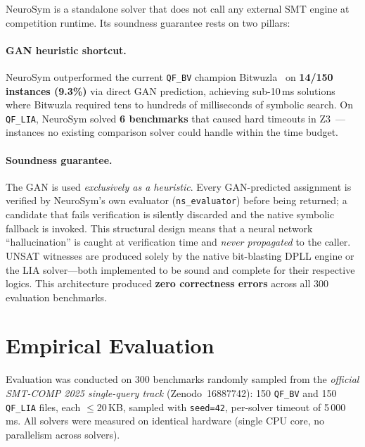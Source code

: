 \documentclass[10pt,a4paper]{article}
\begin{document}
NeuroSym is a standalone solver that does not call any external SMT engine
at competition runtime.  Its soundness guarantee rests on two pillars:

\paragraph{GAN heuristic shortcut.}  NeuroSym outperformed the current
\texttt{QF\_BV} champion Bitwuzla~\cite{bitwuzla} on \textbf{14/150
instances (9.3\%)} via direct GAN prediction, achieving sub-10\,ms solutions
where Bitwuzla required tens to hundreds of milliseconds of symbolic search.
On \texttt{QF\_LIA}, NeuroSym solved \textbf{6 benchmarks} that caused hard
timeouts in Z3~\cite{z3}---instances no existing comparison solver could
handle within the time budget.

\paragraph{Soundness guarantee.}  The GAN is used \emph{exclusively as a
heuristic}.  Every GAN-predicted assignment is verified by NeuroSym's own
evaluator (\texttt{ns\_evaluator}) before being returned; a candidate that
fails verification is silently discarded and the native symbolic fallback is
invoked.  This structural design means that a neural network
``hallucination'' is caught at verification time and \emph{never propagated}
to the caller.  UNSAT witnesses are produced solely by the native
bit-blasting DPLL engine or the LIA solver---both implemented to be sound and
complete for their respective logics.  This architecture produced
\textbf{zero correctness errors} across all 300 evaluation benchmarks.

\section{Empirical Evaluation}
\label{sec:eval}

Evaluation was conducted on 300 benchmarks randomly sampled from the
\emph{official SMT-COMP 2025 single-query track} (Zenodo~16887742): 150
\texttt{QF\_BV} and 150 \texttt{QF\_LIA} files, each $\leq$20\,KB, sampled
with \texttt{seed=42}, per-solver timeout of 5\,000\,ms.  All solvers were
measured on identical hardware (single CPU core, no parallelism across
solvers).
\end{document}

